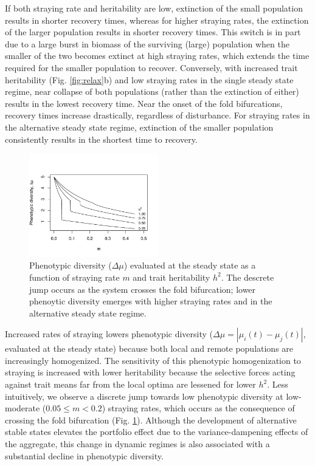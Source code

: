 \documentclass[twocolumn,preprintnumbers,amsmath,amssymb,superscriptaddress]{revtex4}
\begin{document}
If both straying rate and heritability are low, extinction of the small population results in shorter recovery times, whereas for higher straying rates, the extinction of the larger population results in shorter recovery times.
This switch is in part due to a large burst in biomass of the surviving (large) population when the smaller of the two becomes extinct at high straying rates, which extends the time required for the smaller population to recover.
Conversely, with increased trait heritability (Fig. \ref{fig:relax}b) and low straying rates in the single steady state regime, near collapse of both populations (rather than the extinction of either) results in the lowest recovery time.
Near the onset of the fold bifurcations, recovery times increase drastically, regardless of disturbance.
For straying rates in the alternative steady state regime, extinction of the smaller population consistently results in the shortest time to recovery.


\begin{figure}
  \captionsetup{justification=raggedright,
singlelinecheck=false
}
\centering
\includegraphics[width=0.5\textwidth]{figs2/fig_traitdiff.pdf}
\caption{
Phenotypic diversity ($\Delta \mu$) evaluated at the steady state as a function of straying rate $m$ and trait heritability $h^2$. The descrete jump occurs as the system crosses the fold bifurcation; lower phenoytic diversity emerges with higher straying rates and in the alternative steady state regime. 
} \label{fig:traitdiff}
\end{figure}

Increased rates of straying lowers phenotypic diversity ($\Delta \mu = |\mu_i(t)-\mu_j(t)|$, evaluated at the steady state) because both local and remote populations are increasingly homogenized.
The sensitivity of this phenotypic homogenization to straying is increased with lower heritability because the selective forces acting against trait means far from the local optima are lessened for lower $h^2$.
Less intuitively, we observe a discrete jump towards low phenotypic diversity at low-moderate ($0.05 \leq m < 0.2$) straying rates, which occurs as the consequence of crossing the fold bifurcation (Fig. \ref{fig:traitdiff}).
Although the development of alternative stable states elevates the portfolio effect due to the variance-dampening effects of the aggregate, this change in dynamic regimes is also associated with a substantial decline in phenotypic diversity. 
\\
\end{document}
